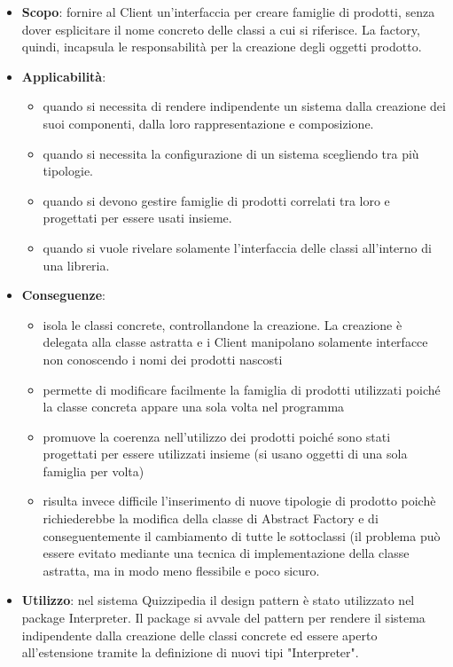 	\begin{itemize}
		\item\textbf{Scopo}: fornire al Client un'interfaccia per creare famiglie di prodotti, senza dover esplicitare il nome concreto delle classi a cui si riferisce. La factory, quindi, incapsula le responsabilità per la creazione degli oggetti prodotto.
		\item\textbf{Applicabilità}:
		\begin{itemize}
			\item quando si necessita di rendere indipendente un sistema dalla creazione dei suoi componenti, dalla loro rappresentazione e composizione.
			\item quando si necessita la configurazione di un sistema scegliendo tra più tipologie.
			\item quando si devono gestire famiglie di prodotti correlati tra loro e progettati per essere usati insieme.
			\item quando si vuole rivelare solamente l'interfaccia delle classi all'interno di una libreria.
		\end{itemize}
		\item\textbf{Conseguenze}:
		\begin{itemize}
			\item isola le classi concrete, controllandone la creazione. La creazione è delegata
alla classe astratta e i Client manipolano solamente interfacce non conoscendo
i nomi dei prodotti nascosti
			\item permette di modificare facilmente la famiglia di prodotti utilizzati poiché la
classe concreta appare una sola volta nel programma
			\item promuove la coerenza nell'utilizzo dei prodotti poiché sono stati progettati per
essere utilizzati insieme (si usano oggetti di una sola famiglia per volta)
			\item risulta invece difficile l'inserimento di nuove tipologie di prodotto poichè richiederebbe la modifica della classe di Abstract Factory e di conseguentemente il
cambiamento di tutte le sottoclassi (il problema può essere evitato mediante
una tecnica di implementazione della classe astratta, ma in modo meno flessibile e poco sicuro.
		\end{itemize}
		\item\textbf{Utilizzo}: nel sistema Quizzipedia il design pattern è stato utilizzato nel package Interpreter. Il package si avvale del pattern per rendere il sistema indipendente dalla creazione delle classi concrete ed essere aperto all'estensione tramite la definizione di nuovi tipi "Interpreter".


\end{itemize}
